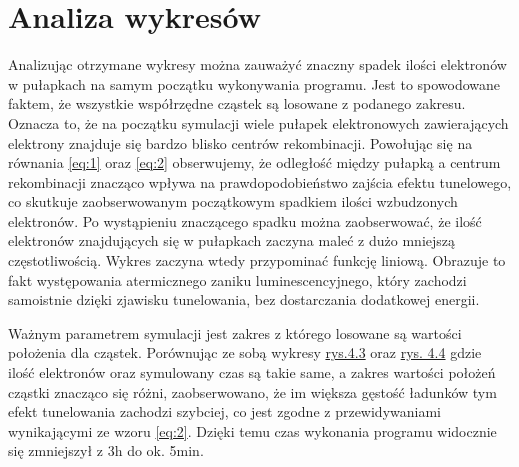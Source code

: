 \section{Analiza wykresów}
Analizując otrzymane wykresy można zauważyć znaczny spadek ilości elektronów w pułapkach na samym początku wykonywania programu. Jest to spowodowane faktem, że wszystkie współrzędne cząstek są losowane z podanego zakresu. Oznacza to, że na początku symulacji wiele pułapek elektronowych zawierających elektrony znajduje się bardzo blisko centrów rekombinacji. Powołując się na równania \ref{eq:1} oraz \ref{eq:2} obserwujemy, że odległość między pułapką a centrum rekombinacji znacząco wpływa na prawdopodobieństwo zajścia efektu tunelowego, co skutkuje zaobserwowanym początkowym spadkiem ilości wzbudzonych elektronów. Po wystąpieniu znaczącego spadku można zaobserwować, że ilość elektronów znajdujących się w pułapkach zaczyna maleć z dużo mniejszą częstotliwością. Wykres zaczyna wtedy przypominać funkcję liniową. Obrazuje to fakt występowania atermicznego zaniku luminescencyjnego, który zachodzi samoistnie dzięki zjawisku tunelowania, bez dostarczania dodatkowej energii. 

Ważnym parametrem symulacji jest zakres z którego losowane są wartości położenia dla cząstek. Porównując ze sobą wykresy \hyperref[rys:1]{rys.4.3} oraz \hyperref[rys:2]{rys. 4.4} gdzie ilość elektronów oraz symulowany czas są takie same, a zakres wartości położeń cząstki znacząco się różni, zaobserwowano, że im większa gęstość ładunków tym efekt tunelowania zachodzi szybciej, co jest zgodne z przewidywaniami wynikającymi ze wzoru \ref{eq:2}. Dzięki temu czas wykonania programu widocznie się zmniejszył z 3h do ok. 5min. 
